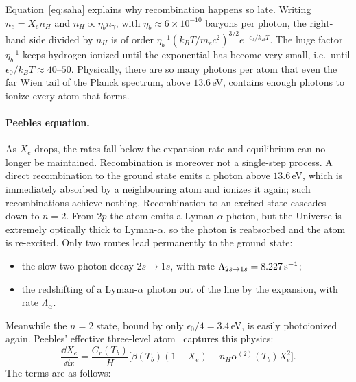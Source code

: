 Equation~\eqref{eq:saha} explains why recombination happens so late. Writing $n_e=X_en_H$ and $n_H\propto\eta_bn_\gamma$,
with $\eta_b\approx6\times10^{-10}$ baryons per photon, the right-hand side divided by $n_H$ is of order
$\eta_b^{-1}(k_BT/m_ec^2)^{3/2}e^{-\epsilon_0/k_BT}$. The huge factor $\eta_b^{-1}$ keeps hydrogen ionized until the
exponential has become very small, i.e.\ until $\epsilon_0/k_BT\approx40$--$50$. Physically, there are so many photons
per atom that even the far Wien tail of the Planck spectrum, above $13.6$\,eV, contains enough photons to ionize every
atom that forms.

\paragraph*{Peebles equation.} As $X_e$ drops, the rates fall below the expansion rate and equilibrium can no longer
be maintained. Recombination is moreover not a single-step process. A direct recombination to the ground state emits a
photon above $13.6$\,eV, which is immediately absorbed by a neighbouring atom and ionizes it again; such recombinations
achieve nothing. Recombination to an excited state cascades down to $n=2$. From $2p$ the atom emits a Lyman-$\alpha$
photon, but the Universe is extremely optically thick to Lyman-$\alpha$, so the photon is reabsorbed and the atom is
re-excited. Only two routes lead permanently to the ground state:
\begin{itemize}
\item the slow two-photon decay $2s\to1s$, with rate $\Lambda_{2s\to1s}=8.227\,{\rm s}^{-1}$;
\item the redshifting of a Lyman-$\alpha$ photon out of the line by the expansion, with rate $\Lambda_\alpha$.
\end{itemize}
Meanwhile the $n=2$ state, bound by only $\epsilon_0/4=3.4$\,eV, is easily photoionized again. Peebles' effective
three-level atom~\cite{Peebles1968} captures this physics:
\begin{equation}
\frac{\dd X_e}{\dd x} = \frac{C_r(T_b)}{H}\Big[\beta(T_b)(1-X_e) - n_H\alpha^{(2)}(T_b)X_e^2\Big].
\label{eq:peebles}
\end{equation}
The terms are as follows:
